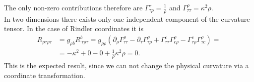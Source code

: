 \documentclass[english, parskip=full]{scrartcl}
\newcommand{\kla}{}
\begin{document}
The only non-zero contributions therefore are $\Gamma^\tau_{\tau\rho} = \frac{1}{\rho}$ and $\Gamma^\rho_{\tau\tau} = \kappa^2\rho$.
\\
In two dimensions there exists only one independent component of the curvature tensor.
In the case of Rindler coordinates it is
\begin{align}
R_{\rho\tau\rho\tau} &= g_{\rho b} R^b_{\ \tau\rho\tau} = g_{\rho\rho} \kla\left( \partial_\rho \Gamma^\rho_{\tau\tau} - \partial_\tau\Gamma^\rho_{\tau\rho} + \Gamma^c_{\tau\tau}\Gamma^\rho_{c\rho} - \Gamma^c_{\tau\rho}\Gamma^\rho_{\tau c} \right) = \\
&= -\kappa^2 + 0 - 0 + \frac{1}{\rho} \kappa^2\rho = 0.
\end{align}
This is the expected result, since we can not change the physical curvature via a coordinate transformation.
\end{document}
